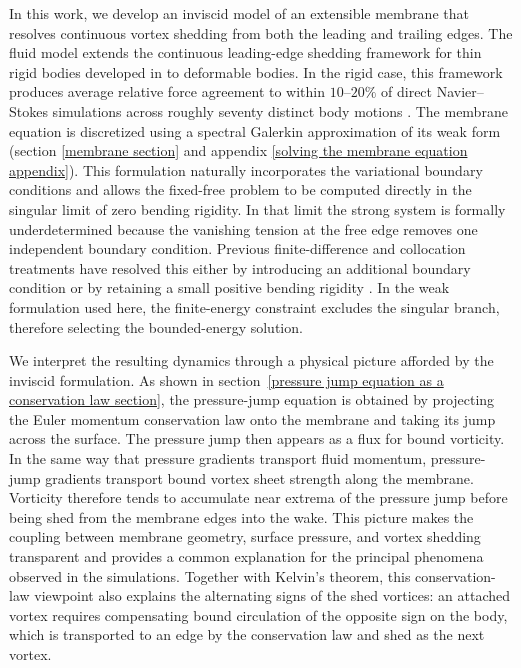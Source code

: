 \documentclass{article}[12pt]
\theoremstyle{Theorem}
\begin{document}
In this work, we develop an inviscid model of an extensible membrane that resolves continuous vortex shedding from both the leading and trailing edges. The fluid model extends the continuous leading-edge shedding framework for thin rigid bodies developed in \cite{loo2025falling, loo2026comparisoninviscidviscousvortex} to deformable bodies. In the rigid case, this framework produces average relative force agreement to within \(10\)--\(20\%\) of direct Navier--Stokes simulations across roughly seventy distinct body motions \cite{loo2026comparisoninviscidviscousvortex}. The membrane equation is discretized using a spectral Galerkin approximation of its weak form (section \ref{membrane section} and appendix \ref{solving the membrane equation appendix}). This formulation naturally incorporates the variational boundary conditions and allows the fixed-free problem to be computed directly in the singular limit of zero bending rigidity. In that limit the strong system is formally underdetermined because the vanishing tension at the free edge removes one independent boundary condition. Previous finite-difference and collocation treatments have resolved this either by introducing an additional boundary condition \cite{mavroyiakoumou2020large} or by retaining a small positive bending rigidity \cite{connell2007flapping}. In the weak formulation used here, the finite-energy constraint excludes the singular branch, therefore selecting the bounded-energy solution.
\newline

We interpret the resulting dynamics through a physical picture afforded by the inviscid formulation. As shown in section~\ref{pressure jump equation as a conservation law section}, the pressure-jump equation is obtained by projecting the Euler momentum conservation law onto the membrane and taking its jump across the surface. The pressure jump then appears as a flux for bound vorticity. In the same way that pressure gradients transport fluid momentum, pressure-jump gradients transport bound vortex sheet strength along the membrane. Vorticity therefore tends to accumulate near extrema of the pressure jump before being shed from the membrane edges into the wake. This picture makes the coupling between membrane geometry, surface pressure, and vortex shedding transparent and provides a common explanation for the principal phenomena observed in the simulations. Together with Kelvin's theorem, this conservation-law viewpoint also explains the alternating signs of the shed vortices: an attached vortex requires compensating bound circulation of the opposite sign on the body, which is transported to an edge by the conservation law and shed as the next vortex.
\newline
\end{document}
